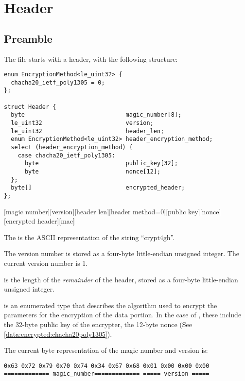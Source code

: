 \section{Header}\label{header}

\subsection{Preamble}\label{header:preamble}

The file starts with a header, with the following structure:

\begin{verbatim}
enum EncryptionMethod<le_uint32> {
  chacha20_ietf_poly1305 = 0;
};

struct Header {
  byte                             magic_number[8];
  le_uint32                        version;
  le_uint32                        header_len;
  enum EncryptionMethod<le_uint32> header_encryption_method;
  select (header_encryption_method) {
    case chacha20_ietf_poly1305:
      byte                         public_key[32];
      byte                         nonce[12];
  };
  byte[]                           encrypted_header;
};
\end{verbatim}

[magic number][version][header len][header method=0][public key][nonce][encrypted header][mac]

The  is the ASCII representation of the string ``crypt4gh''.

The version number is stored as a four-byte little-endian unsigned integer.
%
The current version number is 1.

 is the length of the \emph{remainder} of the header, stored as a four-byte little-endian unsigned integer.
%

 is an enumerated type that describes the algorithm used to encrypt the parameters for the encryption of the data portion.
%
In the case of , these include the 32-byte public key of the encrypter, the 12-byte nonce (See \ref{data:encrypted:chacha20poly1305}).

The current byte representation of the magic number and version is:
\begin{verbatim}
0x63 0x72 0x79 0x70 0x74 0x34 0x67 0x68 0x01 0x00 0x00 0x00
============= magic_number============= ===== version =====
\end{verbatim}



